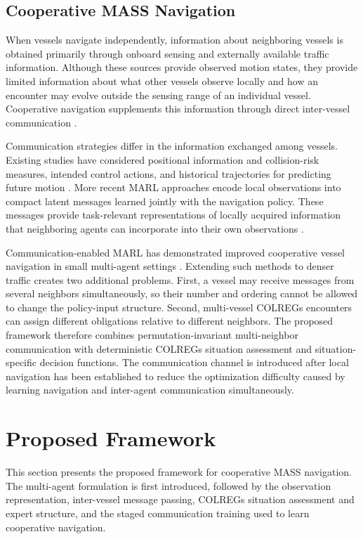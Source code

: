 \documentclass[final,5p,times,twocolumn]{elsarticle}
\begin{document}
{\subsection{Cooperative MASS Navigation}
When vessels navigate independently, information about neighboring vessels is obtained primarily through onboard sensing and externally available traffic information. Although these sources provide observed motion states, they provide limited information about what other vessels observe locally and how an encounter may evolve outside the sensing range of an individual vessel. Cooperative navigation supplements this information through direct inter-vessel communication \citep{Akdag,chen}.

Communication strategies differ in the information exchanged among vessels. Existing studies have considered positional information and collision-risk measures, intended control actions, and historical trajectories for predicting future motion \citep{82,29}. More recent MARL approaches encode local observations into compact latent messages learned jointly with the navigation policy. These messages provide task-relevant representations of locally acquired information that neighboring agents can incorporate into their own observations \citep{WangZhao2025}.

Communication-enabled MARL has demonstrated improved cooperative vessel navigation in small multi-agent settings \citep{WangZhao2025}. Extending such methods to denser traffic creates two additional problems. First, a vessel may receive messages from several neighbors simultaneously, so their number and ordering cannot be allowed to change the policy-input structure. Second, multi-vessel COLREGs encounters can assign different obligations relative to different neighbors. The proposed framework therefore combines permutation-invariant multi-neighbor communication with deterministic COLREGs situation assessment and situation-specific decision functions. The communication channel is introduced after local navigation has been established to reduce the optimization difficulty caused by learning navigation and inter-agent communication simultaneously.
}

\section{Proposed Framework}
\label{sec:framework}
{\color{violet}
This section presents the proposed framework for cooperative MASS navigation. The multi-agent formulation is first introduced, followed by the observation representation, inter-vessel message passing, COLREGs situation assessment and expert structure, and the staged communication training used to learn cooperative navigation.
}
\end{document}
